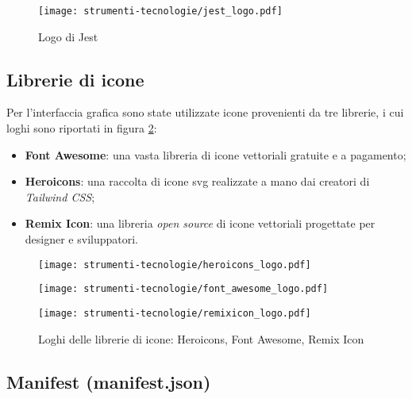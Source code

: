 \begin{figure}[H]
  \centering 
  \texttt{[image: strumenti-tecnologie/jest\_logo.pdf]} 
  \caption{Logo di Jest}
  \label{fig:logo_jest} 
\end{figure}

\subsection*{Librerie di icone}

\par Per l’interfaccia grafica sono state utilizzate icone provenienti da tre librerie, i cui loghi sono riportati in figura \ref{fig:loghi_librerie_icone}:
\begin{itemize}
  \item \textbf{Font Awesome}: una vasta libreria di icone vettoriali gratuite e a pagamento;
  \item \textbf{Heroicons}: una raccolta di icone \gls{svg} realizzate a mano dai creatori di \textit{Tailwind CSS};
  \item \textbf{Remix Icon}: una libreria \textit{open source} di icone vettoriali progettate per designer e sviluppatori.
\end{itemize}

\vspace{5pt}
\begin{figure}[H]
  \centering
  \begin{minipage}{0.3\columnwidth}
    \centering
    \texttt{[image: strumenti-tecnologie/heroicons\_logo.pdf]} 
  \end{minipage}
  \hfill
  \begin{minipage}{0.3\columnwidth}
    \centering
    \texttt{[image: strumenti-tecnologie/font\_awesome\_logo.pdf]} 
  \end{minipage}
  \hfill
  \begin{minipage}{0.3\columnwidth}
    \centering
    \texttt{[image: strumenti-tecnologie/remixicon\_logo.pdf]} 
  \end{minipage}
  \caption{Loghi delle librerie di icone: Heroicons, Font Awesome, Remix Icon}
  \label{fig:loghi_librerie_icone}
\end{figure}
\vspace{5pt}

\subsection*{Manifest (manifest.json)}

